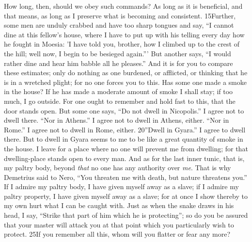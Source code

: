 How long, then, should we obey such commands? As long as it is beneficial, and that means, as long as I preserve what is becoming and consistent. 15Further, some men are unduly crabbed and have too sharp tongues and say, ``I cannot dine at this fellow's house, where I have to put up with his telling every day how he fought in Moesia: 'I have told you, brother, how I climbed up to the crest of the hill; well now, I begin to be besieged again.''' But another says, ``I would rather dine and hear him babble all he pleases.'' And it is for you to compare these estimates; only do nothing as one burdened, or afflicted, or thinking that he is in a wretched plight; for no one forces you to this. Has some one made a smoke in the house? If he has made a moderate amount of smoke I shall stay; if too much, I go outside. For one ought to remember and hold fast to this, that the door stands open. But some one says, ``Do not dwell in Nicopolis.'' I agree not to dwell there. ``Nor in Athens.'' I agree not to dwell in Athens, either. ``Nor in Rome.'' I agree not to dwell in Rome, either. 20''Dwell in Gyara.'' I agree to dwell there. But to dwell in Gyara seems to me to be like a great quantity of smoke in the house. I leave for a place where no one will prevent me from dwelling; for that dwelling-place stands open to every man. And as for the last inner tunic, that is, my paltry body, beyond \emph{that} no one has any authority over \emph{me}. That is why Demetrius said to Nero, ``You threaten me with death, but nature threatens you.'' If I admire my paltry body, I have given myself away as a slave; if I admire my paltry property, I have given myself away as a slave; for at once I show thereby to my own hurt what I can be caught with. Just as when the snake draws in his head, I say, ``Strike that part of him which he is protecting''; so do you be assured that your master will attack you at that point which you particularly wish to protect. 25If you remember all this, whom will you flatter or fear any more?

